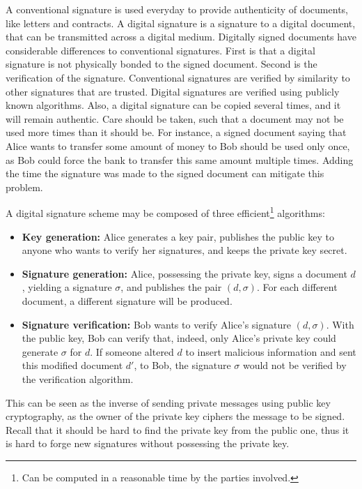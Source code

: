 \documentclass{ufsctex/ufsctex}
\begin{document}
A conventional signature is used everyday to provide authenticity of documents,
like letters and contracts. A digital signature is a signature to a digital
document, that can be transmitted across a digital medium. Digitally signed
documents have considerable differences to conventional signatures. First is
that a digital signature is not physically bonded to the signed document.
Second is the verification of the signature. Conventional signatures are
verified by similarity to other signatures that are trusted. Digital signatures
are verified using publicly known algorithms. Also, a digital signature can be
copied several times, and it will remain authentic. Care should be taken, such
that a document may not be used more times than it should be. For instance, a
signed document saying that Alice wants to transfer some amount of money to Bob
should be used only once, as Bob could force the bank to transfer this same
amount multiple times. Adding the time the signature was made to the signed
document can mitigate this problem.

A digital signature scheme may be composed of three efficient\footnote{Can be
computed in a reasonable time by the parties involved.} algorithms:

\begin{itemize}

	\item \textbf{Key generation:} Alice generates a key pair, publishes the
	public key to anyone who wants to verify her signatures, and keeps the
	private key secret.

	\item \textbf{Signature generation:} Alice, possessing the private key,
	signs a document $d$, yielding a signature $\sigma$, and publishes the pair
	$(d, \sigma)$. For each different document, a different signature will be
	produced.

	\item \textbf{Signature verification:} Bob wants to verify Alice's
	signature $(d, \sigma)$. With the public key, Bob can verify that, indeed,
	only Alice's private key could generate $\sigma$ for $d$. If someone
	altered $d$ to insert malicious information and sent this modified document
	$d'$, to Bob, the signature $\sigma$ would not be verified by the
	verification algorithm.

\end{itemize}

This can be seen as the inverse of sending private messages using public key
cryptography, as the owner of the private key ciphers the message to be signed.
Recall that it should be hard to find the private key from the public one, thus
it is hard to forge new signatures without possessing the private key.
\end{document}
